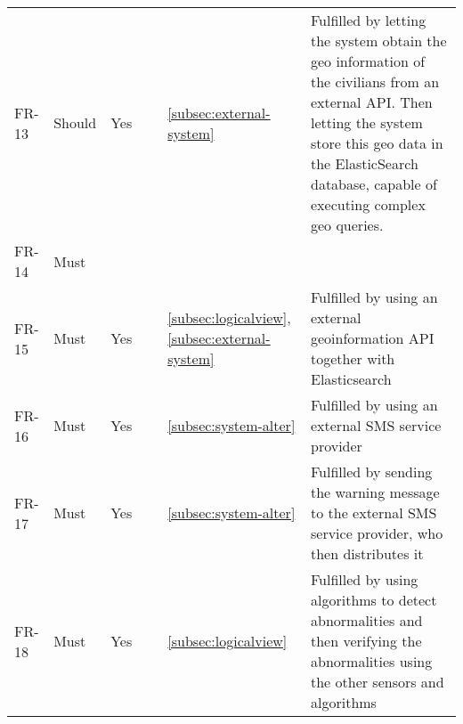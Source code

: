 \begin{table}[H]
\begin{tabular}{lllllL{0.5\textwidth}}
		FR-13 & Should & Yes &  & \ref{subsec:external-system} & Fulfilled by letting the system obtain the geo information of the civilians from an external API. Then letting the system store this geo data in the ElasticSearch database, capable of executing complex geo queries. \\

		FR-14 & Must     & ~        & ~         & ~         & ~\\ 

		FR-15 & Must     & Yes        & ~         & \ref{subsec:logicalview},    \ref{subsec:external-system} & Fulfilled by using an external geoinformation API together with Elasticsearch \\ 
		
			
		FR-16 & Must     & Yes & ~         & \ref{subsec:system-alter}         & Fulfilled by using an external SMS service provider\\ 

		FR-17 & Must     & Yes        & ~         & \ref{subsec:system-alter} & Fulfilled by sending the warning message to the external SMS service provider,  who then distributes it\\ 


		FR-18 & Must     & Yes       & ~         & \ref{subsec:logicalview} & Fulfilled by using algorithms to detect abnormalities and then verifying the abnormalities using the other sensors and algorithms\\ 


\end{tabular}
\end{table}
